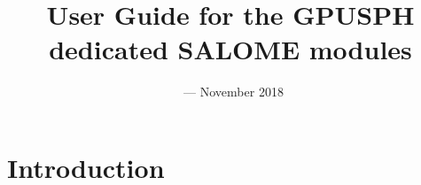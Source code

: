 \documentclass{../GPUSPHtemplate}
\title{User Guide for the GPUSPH dedicated SALOME modules}
\author{}
\date{\currentver\ --- November 2018}
\begin{document}
\maketitle
\tableofcontents
\newpage
\section{Introduction}



\end{document}
